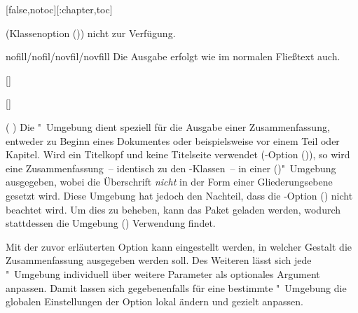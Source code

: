 \begin{Declaration*}{}
\begin{Declaration*}{}
\begin{Declaration*}{}
\begin{Declaration}[%
  v2.02!\Option{abstract=multiple}:ersetzt \Option{abstract=double}'none';%
  v2.02!\Option{abstract=tocleveldown};%
  v2.02!\Option{abstract=markboth};%
  v2.04!\Option{abstract=tocmultiple}%
]{}[false,notoc][:chapter,toc]
\begin{values}{}
  (Klassenoption ()) nicht zur Verfügung.
\item[nofill/nofil/novfil/novfill]
  Die Ausgabe erfolgt wie im normalen Fließtext auch.
\end{values}
\end{Declaration}

\begin{Declaration}{[]}
\begin{Declaration}{[]}
\begin{Declaration}{}
\begin{Declaration}[v2.02]{}
\begin{Declaration}[v2.02]{%
}
\begin{Declaration}{}
\begin{Declaration}{}(%
)
\printdeclarationlist%
%
%
Die "~Umgebung dient speziell für die Ausgabe einer 
Zusammenfassung, entweder zu Beginn eines Dokumentes oder beispielsweise vor 
einem Teil oder Kapitel. Wird ein Titelkopf und keine Titelseite verwendet 
(\KOMAScript-Option ()), so wird 
eine Zusammenfassung~-- identisch zu den \KOMAScript-Klassen~-- in einer 
()"~Umgebung ausgegeben, wobei die 
Überschrift \emph{nicht} in der Form einer Gliederungsebene gesetzt wird. Diese 
Umgebung hat jedoch den Nachteil, dass die \KOMAScript-Option 
() nicht beachtet wird. Um dies zu 
beheben, kann das Paket  geladen werden, wodurch stattdessen 
die Umgebung () Verwendung findet.

Mit der zuvor erläuterten Option  kann eingestellt werden, in 
welcher Gestalt die Zusammenfassung ausgegeben werden soll. Des Weiteren lässt 
sich jede "~Umgebung individuell über weitere Parameter 
als optionales Argument anpassen. Damit lassen sich gegebenenfalls für eine 
bestimmte "~Umgebung die globalen Einstellungen 
der Option  lokal ändern und gezielt anpassen. 


\end{Declaration}
\end{Declaration}
\end{Declaration}
\end{Declaration}
\end{Declaration}
\end{Declaration}
\end{Declaration}
\end{Declaration*}
\end{Declaration*}
\end{Declaration*}
